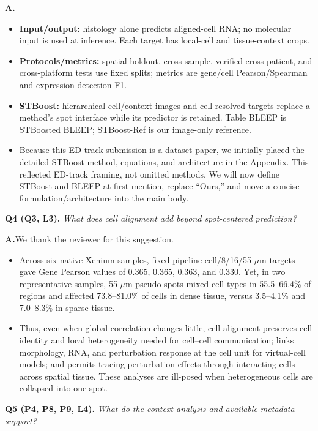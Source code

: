 \documentclass[10pt]{article}
\newcommand{\questionsep}{\par\vspace{1.1em}}
\begin{document}
\textbf{A.}
\begin{itemize}
\item \textbf{Input/output:} histology alone predicts aligned-cell RNA; no
molecular input is used at inference. Each target has local-cell and
tissue-context crops.
\item \textbf{Protocols/metrics:} spatial holdout, cross-sample, verified
cross-patient, and cross-platform tests use fixed splits; metrics are gene/cell
Pearson/Spearman and expression-detection F1.
\item \textbf{STBoost:} hierarchical cell/context images and cell-resolved
targets replace a method's spot interface while its predictor is retained.
Table BLEEP is STBoosted BLEEP; STBoost-Ref is our image-only reference.
\item Because this ED-track submission is a dataset paper, we initially placed
the detailed STBoost method, equations, and architecture in the Appendix. This
reflected ED-track framing, not omitted methods. We will now define STBoost and
BLEEP at first mention, replace ``Ours,'' and move a concise
formulation/architecture into the main body.
\end{itemize}

\questionsep
\textbf{Q4 (Q3, L3).}\quad
\textit{What does cell alignment add beyond spot-centered prediction?}

\textbf{A.}\enspace We thank the reviewer for this suggestion.
\begin{itemize}
\item Across six native-Xenium samples, fixed-pipeline cell/8/16/55-\(\mu\)m
targets gave Gene Pearson values of 0.365, 0.365, 0.363, and 0.330. Yet, in two
representative samples, 55-\(\mu\)m pseudo-spots mixed cell types in
55.5--66.4\% of regions and affected 73.8--81.0\% of cells in dense tissue,
versus 3.5--4.1\% and 7.0--8.3\% in sparse tissue.
\item Thus, even when global correlation changes little, cell alignment
preserves cell identity and local heterogeneity needed for cell--cell
communication; links morphology, RNA, and perturbation response at the cell
unit for virtual-cell models; and permits tracing perturbation effects through
interacting cells across spatial tissue. These analyses are ill-posed when
heterogeneous cells are collapsed into one spot.
\end{itemize}

\questionsep
\textbf{Q5 (P4, P8, P9, L4).}\quad
\textit{What do the context analysis and available metadata support?}
\end{document}
